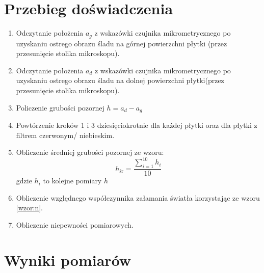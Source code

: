 \documentclass[a4paper,11pt]{article}
\begin{document}
\section{Przebieg doświadczenia}
\begin{enumerate}
\item Odczytanie położenia $a_{g}$ z wskazówki czujnika mikrometrycznego po uzyskaniu ostrego obrazu śladu na górnej powierzchni płytki (przez przesunięcie stolika mikroskopu).
\item Odczytanie położenia $a_{d}$ z wskazówki czujnika mikrometrycznego po uzyskaniu ostrego obrazu śladu na dolnej powierzchni płytki(przez przesunięcie stolika mikroskopu).
\item Policzenie grubości pozornej $h = a_{d} - a_{g}$
\item Powtórzenie kroków 1 i 3 dziesięciokrotnie dla każdej płytki oraz dla płytki z filtrem czerwonym/ niebieskim.
\item Obliczenie średniej grubości pozornej ze wzoru:
\begin{equation}
\label{wzor:hśr}
h_{\text{śr}} = \frac{\sum_{i=1}^{10}h_{i}}{10}
\end{equation}
gdzie $h_{i}$ to kolejne pomiary $h$
\item Obliczenie względnego współczynnika załamania światła korzystając ze wzoru {\ref{wzor:n}}.
\item Obliczenie niepewności pomiarowych.
\end{enumerate}

\section{Wyniki pomiarów}
\end{document}
